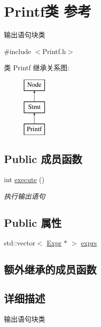 \hypertarget{class_printf}{}\section{Printf类 参考}
\label{class_printf}


输出语句块类  




{\ttfamily \#include $<$Printf.\+h$>$}

类 Printf 继承关系图\+:\begin{figure}[H]
\begin{center}
\leavevmode
\includegraphics[height=3.000000cm]{class_printf}
\end{center}
\end{figure}
\subsection*{Public 成员函数}
\begin{DoxyCompactItemize}
\item 
\mbox{\label{class_printf_a0343199e28647ced40b9d74a284ff5f3}} 
int \hyperlink{class_printf_a0343199e28647ced40b9d74a284ff5f3}{execute} ()
\begin{DoxyCompactList}\small\item\em 执行输出语句 \end{DoxyCompactList}\end{DoxyCompactItemize}
\subsection*{Public 属性}
\begin{DoxyCompactItemize}
\item 
std\+::vector$<$ \hyperlink{class_expr}{Expr} $\ast$ $>$ \hyperlink{class_printf_ab07a181eb9cd79c9018e172332d44ce5}{exprs}
\end{DoxyCompactItemize}
\subsection*{额外继承的成员函数}


\subsection{详细描述}
输出语句块类 


